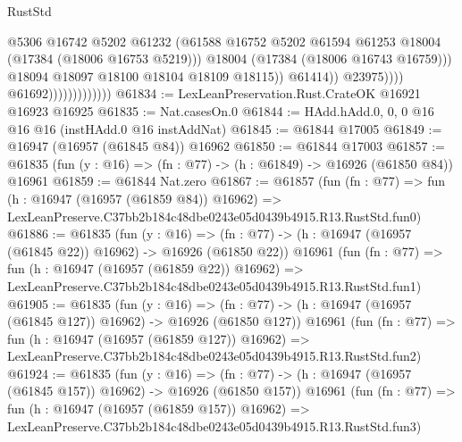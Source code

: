 \begin{lexlean}{RustStd}
\begin{coremodule}
                                                @5306
                                                @16742
                                                @5202
                                                @61232
                                                (@61588
                                                  @16752
                                                  @5202
                                                  @61594
                                                  @61253
                                                  @18004
                                                  (@17384 (@18006 @16753 @5219)))
                                                @18004
                                                (@17384 (@18006 @16743 @16759)))
                                              @18094
                                              @18097
                                              @18100
                                              @18104
                                              @18109
                                              @18115))
                                          @61414))
                                      @23975))))
                              @61692)))))))))))))
@61834 := LexLeanPreservation.Rust.CrateOK @16921 @16923 @16925
@61835 := Nat.casesOn.{0}
@61844 := HAdd.hAdd.{0, 0, 0} @16 @16 @16 (instHAdd.{0} @16 instAddNat)
@61845 := @61844 @17005
@61849 := @16947 (@16957 (@61845 @84)) @16962
@61850 := @61844 @17003
@61857 := @61835 (fun (y : @16) => (fn : @77) -> (h : @61849) -> @16926 (@61850 @84)) @16961
@61859 := @61844 Nat.zero
@61867 := @61857
    (fun (fn : @77) =>
    fun (h : @16947 (@16957 (@61859 @84)) @16962) =>
    LexLeanPreserve.C37bb2b184c48dbe0243e05d0439b4915.R13.RustStd.fun0)
@61886 := @61835
    (fun (y : @16) =>
    (fn : @77) -> (h : @16947 (@16957 (@61845 @22)) @16962) -> @16926 (@61850 @22))
    @16961
    (fun (fn : @77) =>
    fun (h : @16947 (@16957 (@61859 @22)) @16962) =>
    LexLeanPreserve.C37bb2b184c48dbe0243e05d0439b4915.R13.RustStd.fun1)
@61905 := @61835
    (fun (y : @16) =>
    (fn : @77) -> (h : @16947 (@16957 (@61845 @127)) @16962) -> @16926 (@61850 @127))
    @16961
    (fun (fn : @77) =>
    fun (h : @16947 (@16957 (@61859 @127)) @16962) =>
    LexLeanPreserve.C37bb2b184c48dbe0243e05d0439b4915.R13.RustStd.fun2)
@61924 := @61835
    (fun (y : @16) =>
    (fn : @77) -> (h : @16947 (@16957 (@61845 @157)) @16962) -> @16926 (@61850 @157))
    @16961
    (fun (fn : @77) =>
    fun (h : @16947 (@16957 (@61859 @157)) @16962) =>
    LexLeanPreserve.C37bb2b184c48dbe0243e05d0439b4915.R13.RustStd.fun3)

\end{coremodule}
\end{lexlean}
